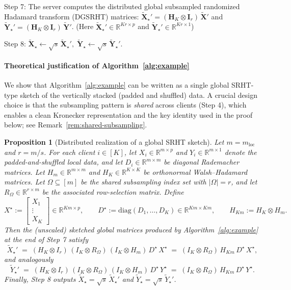 \documentclass[11pt]{article}
\numberwithin{equation}{section}
\theoremstyle{plain}
\newtheorem{proposition}[theorem]{Proposition}
\theoremstyle{definition}
\theoremstyle{remark}
\begin{document}
\begin{algorithm}[H]
Step 7: The server computes the distributed global subsampled randomized Hadamard transform (DGSRHT) matrices:
$\tilde{\mathbf{X}}_{\star}' = (\mathbf{H}_K \otimes \mathbf{I}_{r})\,\tilde{\mathbf{X}}'$
and
$\tilde{\mathbf{Y}}_{\star}' = (\mathbf{H}_K \otimes \mathbf{I}_{r})\,\tilde{\mathbf{Y}}'$.
(Here $\tilde{\mathbf{X}}_{\star}'\in\mathbb{R}^{Kr\times p}$ and $\tilde{\mathbf{Y}}_{\star}'\in\mathbb{R}^{Kr\times 1}$)

Step 8: $\tilde{\mathbf{X}}_{\star} \leftarrow \sqrt{s}\,\tilde{\mathbf{X}}_{\star}',\;
\tilde{\mathbf{Y}}_{\star} \leftarrow \sqrt{s}\,\tilde{\mathbf{Y}}_{\star}'$.

\end{algorithm}

\paragraph{Theoretical justification of Algorithm~\ref{alg:example}}
We show that Algorithm~\ref{alg:example} can be written as a single global SRHT-type sketch of the vertically stacked (padded and shuffled) data. A crucial design choice is that the subsampling pattern is \emph{shared} across clients (Step 4), which enables a clean Kronecker representation and the key identity used in the proof below; see Remark~\ref{rem:shared-subsampling}.

\begin{proposition}[Distributed realization of a global SRHT sketch]
\label{prop:global-srht}
Let $m=m_{\mathrm{loc}}$ and $r=m/s$.
For each client $i\in[K]$, let $X_i\in\mathbb{R}^{m\times p}$ and $Y_i\in\mathbb{R}^{m\times 1}$ denote the padded-and-shuffled local data,
and let $D_i\in\mathbb{R}^{m\times m}$ be diagonal Rademacher matrices.
Let $H_m\in\mathbb{R}^{m\times m}$ and $H_K\in\mathbb{R}^{K\times K}$ be orthonormal Walsh--Hadamard matrices.
Let $\Omega\subseteq[m]$ be the shared subsampling index set with $|\Omega|=r$, and let $R_{\Omega}\in\mathbb{R}^{r\times m}$ be the associated row-selection matrix.
Define
\[
X^\star := \begin{bmatrix} X_1 \\ \vdots \\ X_K \end{bmatrix}\in\mathbb{R}^{Km\times p},
\qquad
D^\star := \mathrm{diag}(D_1,\dots,D_K)\in\mathbb{R}^{Km\times Km},
\qquad
H_{Km} := H_K\otimes H_m .
\]
Then the (unscaled) sketched global matrices produced by Algorithm~\ref{alg:example} at the end of Step 7 satisfy
\[
\tilde X_\star' \;=\; (H_K\otimes I_r)\,(I_K\otimes R_{\Omega})\,(I_K\otimes H_m)\,D^\star\,X^\star
\;=\; (I_K\otimes R_{\Omega})\,H_{Km}\,D^\star\,X^\star,
\]
and analogously
\[
\tilde Y_\star' \;=\; (H_K\otimes I_r)\,(I_K\otimes R_{\Omega})\,(I_K\otimes H_m)\,D^\star\,Y^\star
\;=\; (I_K\otimes R_{\Omega})\,H_{Km}\,D^\star\,Y^\star.
\]
Finally, Step 8 outputs $\tilde X_\star=\sqrt{s}\,\tilde X_\star'$ and $\tilde Y_\star=\sqrt{s}\,\tilde Y_\star'$.
\end{proposition}
\end{document}
